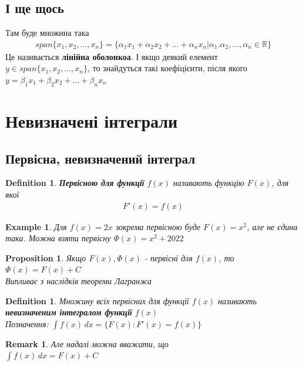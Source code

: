 \documentclass[a4paper, 14pt]{extarticle}
\def\huge{\displaystyle}
\theoremstyle{theoremdd}
\theoremstyle{theoremdd}
\newtheorem{definition}[theorem]{Definition}
\theoremstyle{theoremdd}
\theoremstyle{theoremdd}
\newtheorem{example}[theorem]{Example}
\theoremstyle{theoremdd}
\newtheorem{proposition}[theorem]{Proposition}
\theoremstyle{theoremdd}
\newtheorem{remark}[theorem]{Remark}
\theoremstyle{theoremdd}
\theoremstyle{theoremdd}
\begin{document}
\subsection*{І ще щось}
Там буде множина така
\begin{align*}
span \{x_1, x_2, \dots, x_n\} = \{\alpha_1 x_1 + \alpha_2 x_2 + \dots + \alpha_n x_n | \alpha_1.\alpha_2,\dots,\alpha_n \in \mathbb{R} \}
\end{align*}
Це називається \textbf{лінійна оболонкоа}. І якщо деякий елемент $y \in span \{x_1,x_2,\dots,x_n\}$, то знайдуться такі коефіцієнти, після якого\\
$y = \beta_1 x_1 + \beta_2 x_2 + \dots + \beta_n x_n$
\newpage

\section{Невизначені інтеграли}
\subsection{Первісна, невизначений інтеграл}
\begin{definition}
\textbf{Первісною для функції} $f(x)$ називають функцію $F(x)$, для якої
\begin{align*}
F'(x) = f(x)
\end{align*}
\end{definition}

\begin{example}
Для $f(x) = 2x$ зокрема первісною буде $F(x) = x^2$, але не єдина така. Можна взяти первісну $\Phi(x) = x^2 + 2022$
\end{example}

\begin{proposition}
Якщо $F(x), \Phi(x)$ - первісні для $f(x)$, то \\ $\Phi(x) = F(x) + C$\\
\textit{Випливає з наслідків теореми Лагранжа}
\end{proposition}

\begin{definition}
Множину всіх первісних для функції $f(x)$ називають \textbf{невизначеним інтегралом функції} $f(x)$\\
Позначення: $\huge \int f(x) \,dx = \{F(x): F'(x) = f(x)\}$
\end{definition}

\begin{remark}
Але надалі можна вважати, що\\
$\huge \int f(x) \,dx = F(x) + C$
\end{remark}
\end{document}
